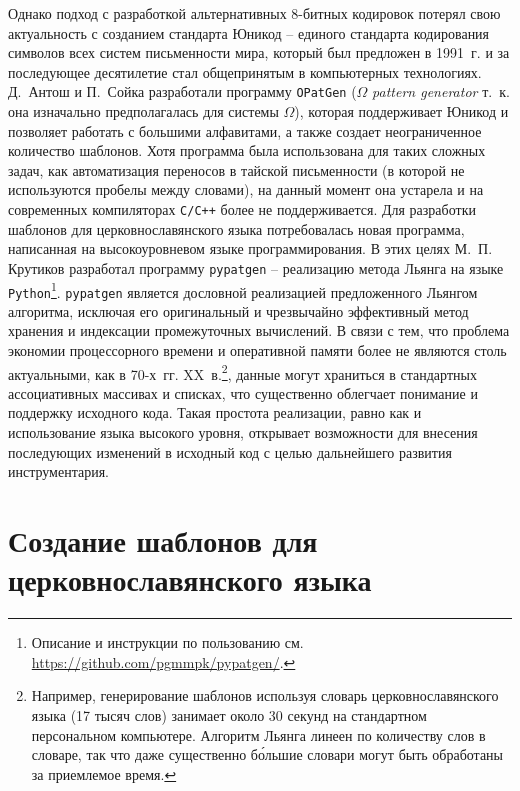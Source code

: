\documentclass[12pt,a4paper,oneside]{extarticle}
\begin{document}
Однако подход с разработкой альтернативных 8-битных кодировок потерял свою актуальность с созданием стандарта Юникод -- единого стандарта кодирования символов всех систем письменности мира, который был предложен в 1991~г. и за последующее десятилетие стал общепринятым в компьютерных технологиях. Д.~Антош и  П.~Сойка разработали программу \verb+OPatGen+ ($\Omega$ \emph{pattern generator} т.~к. она изначально предполагалась для системы $\Omega$), которая поддерживает Юникод и позволяет работать с большими алфавитами, а также создает неограниченное количество шаблонов\autocite[][]{opatgen}. Хотя программа была использована для таких сложных задач, как автоматизация переносов в тайской письменности (в которой не используются пробелы между словами)\autocite[][]{sojka2003}, на данный момент она устарела и на современных компиляторах \verb!C/C++! более не поддерживается. Для разработки шаблонов для церковнославянского языка потребовалась новая программа, написанная на  высокоуровневом языке программирования. В этих целях М.~П. Крутиков разработал программу \verb+pypatgen+ -- реализацию метода Льянга на языке \verb+Python+\footnote{Описание и инструкции по пользованию см. \url{https://github.com/pgmmpk/pypatgen/}.}. \verb+pypatgen+ является дословной реализацией предложенного Льянгом алгоритма, исключая его оригинальный и чрезвычайно эффективный метод хранения и индексации промежуточных вычислений. В связи с тем, что проблема экономии процессорного времени и оперативной памяти более не являются столь актуальными, как в 70-х~гг. XX~в.\footnote{Например, генерирование шаблонов используя словарь церковнославянского языка (17 тысяч слов) занимает около 30 секунд на стандартном персональном компьютере. Алгоритм Льянга линеен по количеству слов в словаре, так что даже существенно б\'ольшие словари могут быть обработаны за приемлемое время.}, данные могут храниться в стандартных ассоциативных массивах и списках, что существенно облегчает понимание и поддержку исходного кода. Такая простота реализации, равно как и использование языка высокого уровня, открывает возможности для внесения последующих изменений в исходный код с целью дальнейшего развития инструментария.

\section{Создание шаблонов для церковнославянского языка}
\end{document}
